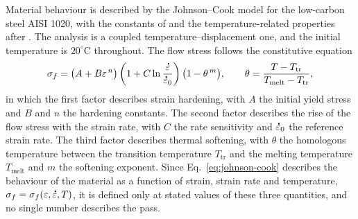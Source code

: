 \documentclass[subscriptcorrection,upint,varvw,barcolor=Goldenrod3,mathalfa=cal=euler,balance,hyphenate,french,pdf-a]{asmejour} %
\newcommand{\edot}{\accentset{\scalebox{0.4}{$\bullet$}}{\varepsilon}}
\begin{document}
Material behaviour is described by the Johnson--Cook model for the low-carbon steel AISI 1020, with the constants of
\citep{10.1680/jemmr.16.00019} and the temperature-related properties after \citep{shi2006analytical}. The analysis is a coupled temperature--displacement one, and the
initial temperature is $20^\circ$C throughout. The flow stress follows the constitutive equation
\begin{equation}
\sigma_f = \bigl(A + B\varepsilon^{\,n}\bigr)
           \left(1 + C\ln\frac{\edot}{\edot_0}\right)
           \bigl(1 - \theta^{\,m}\bigr), \qquad
\theta = \frac{T - T_{\mathrm{tr}}}{T_{\mathrm{melt}} - T_{\mathrm{tr}}},
\label{eq:johnson-cook}
\end{equation}
in which the first factor describes strain hardening, with $A$ the initial yield stress and $B$
and $n$ the hardening constants. The second factor describes the rise of the flow stress with the
strain rate, with $C$ the rate sensitivity and $\edot_0$ the reference strain rate. The third
factor describes thermal softening, with $\theta$ the homologous temperature between the
transition temperature $T_{\mathrm{tr}}$ and the melting temperature $T_{\mathrm{melt}}$ and $m$
the softening exponent. Since Eq.~\eqref{eq:johnson-cook} describes the behaviour of the material
as a function of strain, strain rate and temperature, $\sigma_f = \sigma_f(\varepsilon,\edot,T)$,
it is defined only at stated values of these three quantities, and no single number describes
the pass.

\end{document}
